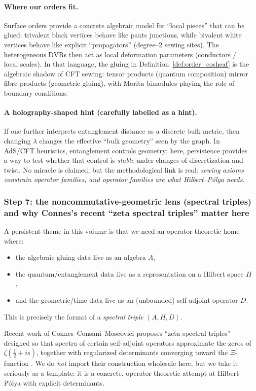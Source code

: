\documentclass[11pt,oneside]{amsbook}
\numberwithin{equation}{section}
\theoremstyle{plain}
\theoremstyle{definition}
\theoremstyle{remark}
\begin{document}
\paragraph{Where our orders fit.}
Surface orders provide a concrete algebraic model for ``local pieces'' that can be glued:
trivalent black vertices behave like pants junctions, while bivalent white vertices behave like explicit ``propagators'' (degree--2 sewing sites).
The heterogeneous DVRs then act as local deformation parameters (conductors / local scales).
In that language, the gluing in Definition~\ref{def:order_cosheaf} is the algebraic shadow of CFT sewing:
tensor products (quantum composition) mirror fibre products (geometric gluing), with Morita bimodules playing the role of boundary conditions.

\paragraph{A holography-shaped hint (carefully labelled as a hint).}
If one further interprets entanglement distance as a discrete bulk metric, then changing $\lambda$ changes the effective ``bulk geometry'' seen by the graph.
In AdS/CFT heuristics, entanglement controls geometry; here, persistence provides a way to test whether that control is \emph{stable} under changes of discretization and twist.
No miracle is claimed, but the methodological link is real:
\emph{sewing axioms constrain operator families, and operator families are what Hilbert--Pólya needs.}

\subsubsection{Step 7: the noncommutative-geometric lens (spectral triples) and why Connes's recent ``zeta spectral triples'' matter here}

A persistent theme in this volume is that we need an operator-theoretic home where:
\begin{itemize}
\item the algebraic gluing data live as an algebra $A$,
\item the quantum/entanglement data live as a representation on a Hilbert space $H$,
\item and the geometric/time data live as an (unbounded) self-adjoint operator $D$.
\end{itemize}
This is precisely the format of a \emph{spectral triple} $(A,H,D)$.

Recent work of Connes--Consani--Moscovici proposes ``zeta spectral triples'' designed so that spectra of certain self-adjoint operators approximate the zeros of $\zeta(\tfrac12+is)$, together with regularized determinants converging toward the $\Xi$-function \cite{ConnesConsaniMoscovici2025ZetaSpectralTriples}.
We do \emph{not} import their construction wholesale here, but we take it seriously as a template:
it is a concrete, operator-theoretic attempt at Hilbert--Pólya with explicit determinants.
\end{document}

